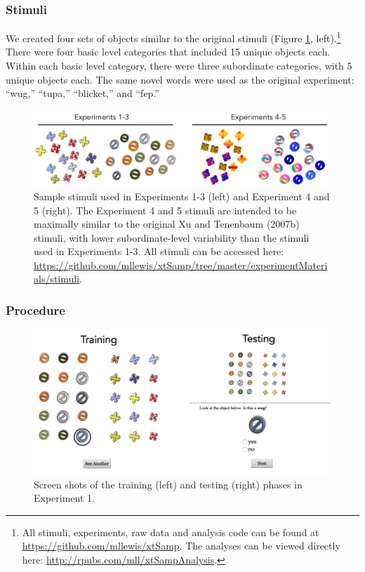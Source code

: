 \documentclass[man]{apa2}
\begin{document}
\subsubsection{Stimuli}
We created four sets of objects similar to the original stimuli (Figure \ref{fig:stims}, left).\footnote{All stimuli, experiments, raw data and analysis code can be found at \url{https://github.com/mllewis/xtSamp}. The analyses can be viewed directly here: \url{http://rpubs.com/mll/xtSampAnalysis}.} There were four basic level categories that included 15 unique objects each. Within each basic level category, there were three subordinate categories, with 5 unique objects each. The same novel words were used as the original experiment: ``wug,'' ``tupa,'' ``blicket,'' and ``fep.''
\begin{figure}[t]
 \begin{center} 
 \includegraphics[width=5in]{figures/stims.png} 
 \caption{ \label{fig:stims} Sample stimuli used in Experiments 1-3 (left) and Experiment 4 and 5 (right). The Experiment 4 and 5 stimuli are intended to be maximally similar to the original Xu and Tenenbaum (2007b) stimuli, with lower subordinate-level variability than the stimuli used in Experiments 1-3. All stimuli can be accessed here: \url{https://github.com/mllewis/xtSamp/tree/master/experimentMaterials/stimuli}. } 
 \end{center} 
\end{figure}	
 
\subsubsection{Procedure}
 \begin{figure} [t]
 \begin{center} 
 \includegraphics[width=5.5in]{figures/screen.png} 
 \caption{\label{fig:screen} Screen shots of the training (left) and testing (right) phases in Experiment 1. } 
 \end{center} 
\end{figure}
\end{document}
